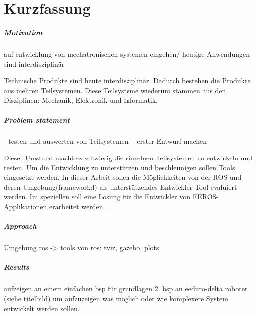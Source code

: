 \chapter*{Kurzfassung}


\paragraph*{Motivation}
auf entwicklung von mechatronischen systemen eingehen/ heutige Anwendungen sind interdisziplinär 

Technische Produkte sind heute interdisziplinär. Dadurch bestehen die Produkte aus mehren Teilsystemen. 
Diese Teilsysteme wiederum  stammen aus den Disziplinen: Mechanik, Elektronik und Informatik.


\paragraph*{Problem statement}
- testen und auswerten von Teilsystemen.
- erster Entwurf machen

Dieser Umstand macht es schwierig die einzelnen Teilsystemen zu entwickeln und testen.
Um die Entwicklung zu unterstützen und beschleunigen sollen Tools eingesetzt werden.
In dieser Arbeit sollen die Möglichkeiten von der ROS und deren Umgebung(frameworkd) als unterstützendes Entwickler-Tool evaluiert werden.
Im speziellen soll eine Lösung für die Entwickler von EEROS-Applikationen erarbeitet werden.

\paragraph*{Approach}
Umgebung ros -> tools von ros: rviz, gazebo, plots



\paragraph*{Results}
aufzeigen an einem einfachen bsp für grundlagen 
2. bsp an eeduro-delta roboter (siehe titelbild) um aufzuzeigen was möglich oder wie komplexere System entwickelt werden sollen.

